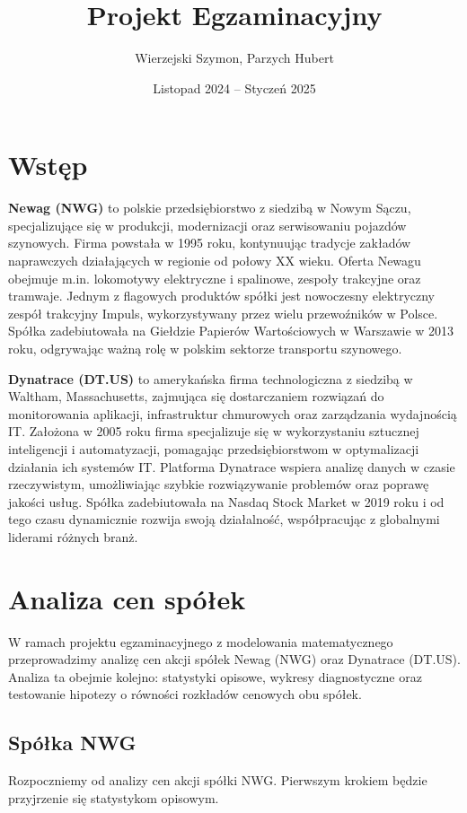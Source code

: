 \documentclass[a4paper,11pt]{article}
\title{Projekt Egzaminacyjny}
\author{Wierzejski Szymon, Parzych Hubert}
\date{Listopad 2024 -- Styczeń 2025}
\begin{document}
\maketitle
\newpage

\tableofcontents
\newpage

\vspace*{4cm}
\section{Wstęp}

\textbf{Newag (NWG)} to polskie przedsiębiorstwo z siedzibą w Nowym Sączu, specjalizujące się w produkcji, modernizacji oraz serwisowaniu pojazdów szynowych. Firma powstała w 1995 roku, kontynuując tradycje zakładów naprawczych działających w regionie od połowy XX wieku. Oferta Newagu obejmuje m.in. lokomotywy elektryczne i spalinowe, zespoły trakcyjne oraz tramwaje. Jednym z flagowych produktów spółki jest nowoczesny elektryczny zespół trakcyjny Impuls, wykorzystywany przez wielu przewoźników w Polsce. Spółka zadebiutowała na Giełdzie Papierów Wartościowych w Warszawie w 2013 roku, odgrywając ważną rolę w polskim sektorze transportu szynowego.

\smallskip

\textbf{Dynatrace (DT.US)} to amerykańska firma technologiczna z siedzibą w Waltham, Massachusetts, zajmująca się dostarczaniem rozwiązań do monitorowania aplikacji, infrastruktur chmurowych oraz zarządzania wydajnością IT. Założona w 2005 roku firma specjalizuje się w wykorzystaniu sztucznej inteligencji i automatyzacji, pomagając przedsiębiorstwom w optymalizacji działania ich systemów IT. Platforma Dynatrace wspiera analizę danych w czasie rzeczywistym, umożliwiając szybkie rozwiązywanie problemów oraz poprawę jakości usług. Spółka zadebiutowała na Nasdaq Stock Market w 2019 roku i od tego czasu dynamicznie rozwija swoją działalność, współpracując z globalnymi liderami różnych branż.

\newpage

\section {Analiza cen spółek}
W ramach projektu egzaminacyjnego z modelowania matematycznego przeprowadzimy analizę cen akcji spółek Newag (NWG) oraz Dynatrace (DT.US). Analiza ta obejmie kolejno: statystyki opisowe, wykresy diagnostyczne oraz testowanie hipotezy o równości rozkładów cenowych obu spółek.

\subsection{Spółka NWG}
Rozpoczniemy od analizy cen akcji spółki NWG. Pierwszym krokiem będzie przyjrzenie się statystykom opisowym.
\end{document}
